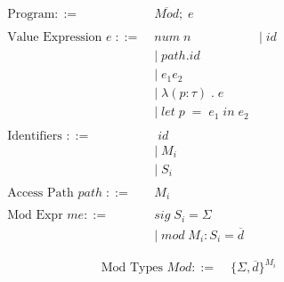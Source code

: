 \documentclass[10pt,a4paper]{report}
\begin{document}
\begin{figure}[!htb]
\begin{align*}
\begin{aligned}
\text{Program} ::= \; & \overline{\mathit{Mod}};\;e\\
\\
\text{Value Expression }e \; ::= \; &\mathit{num \; n \;} %
&|\;\mathit{id}  \\
&|\;\mathit{path.id} \\
&|\;e_{1}e_{2} \\
&|\;\lambda(p:\tau)\;.\;e \\
&|\;\mathit{let }\; p \; = \; e_{1} \; in \; e_{2} \\
\\
\text{Identifiers } ::= \; & \; id \\ 
&|\;M_{i}\\
&|\;S_{i}\\
\\
\text{Access Path } \mathit{path} \; ::= \; &\mathit{M_{i}}\\
\\
\text{Mod Expr } \mathit{me} ::= \; & \mathit{sig} \; S_{i} = \Sigma\\
&|\; \mathit{mod} \;  M_{i} : S_{i} = \overline{\mathit{d}} \\
\\
\end{aligned}
\begin{aligned}
\text{Mod Types } \mathit{Mod} ::=\;&\lbrace \Sigma, \overline{\mathit{d}} \rbrace^{M_{i}} \\
\\

\end{aligned}
\end{align*}
\end{figure}
\end{document}
